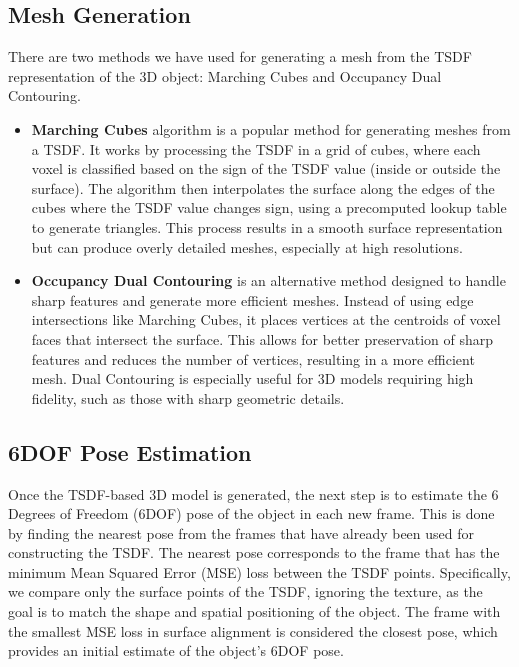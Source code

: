 \documentclass[conference]{IEEEtran}
\begin{document}
\begin{enumerate}
\end{enumerate}


\subsection{Mesh Generation}
There are two methods we have used for generating a mesh from the TSDF representation of the 3D object: Marching Cubes and Occupancy Dual Contouring.
\begin{itemize}
    \item \textbf{Marching Cubes} algorithm is a popular method for generating meshes from a TSDF. It works by processing the TSDF in a grid of cubes, where each voxel is classified based on the sign of the TSDF value (inside or outside the surface). The algorithm then interpolates the surface along the edges of the cubes where the TSDF value changes sign, using a precomputed lookup table to generate triangles. This process results in a smooth surface representation but can produce overly detailed meshes, especially at high resolutions.
    \item \textbf{Occupancy Dual Contouring} is an alternative method designed to handle sharp features and generate more efficient meshes. Instead of using edge intersections like Marching Cubes, it places vertices at the centroids of voxel faces that intersect the surface. This allows for better preservation of sharp features and reduces the number of vertices, resulting in a more efficient mesh. Dual Contouring is especially useful for 3D models requiring high fidelity, such as those with sharp geometric details.
\end{itemize}

\subsection{6DOF Pose Estimation}
Once the TSDF-based 3D model is generated, the next step is to estimate the 6 Degrees of Freedom (6DOF) pose of the object in each new frame. This is done by finding the nearest pose from the frames that have already been used for constructing the TSDF. The nearest pose corresponds to the frame that has the minimum Mean Squared Error (MSE) loss between the TSDF points. Specifically, we compare only the surface points of the TSDF, ignoring the texture, as the goal is to match the shape and spatial positioning of the object. The frame with the smallest MSE loss in surface alignment is considered the closest pose, which provides an initial estimate of the object's 6DOF pose.
\end{document}
